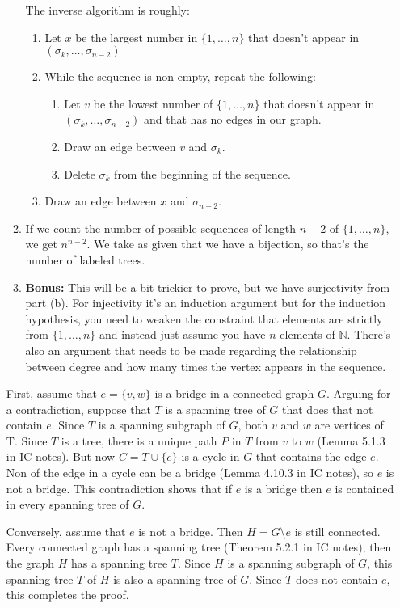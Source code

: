 \begin{enumerate}
\begin{enumerate}
    The inverse algorithm is roughly:
    \begin{enumerate}
    \item Let $x$ be the largest number in $\{1, \dots, n\}$ that doesn't appear in $(\sigma_k, \dots, \sigma_{n-2})$
    \item While the sequence is non-empty, repeat the following:
        \begin{enumerate}
            \item Let $v$ be the lowest number of $\{1, \dots, n\}$ that doesn't appear in $(\sigma_k, \dots, \sigma_{n-2})$ and that has no edges in our graph.
            \item Draw an edge between $v$ and $\sigma_k$.
            \item Delete $\sigma_{k}$ from the beginning of the sequence. 
        \end{enumerate}
    \item Draw an edge between $x$ and $\sigma_{n-2}$.
    \end{enumerate}
    \item If we count the number of possible sequences of length $n-2$ of $\{1, \dots, n\}$, we get $n^{n-2}$. We take as given that we have a bijection, so that's the number of labeled trees.

    \item \textbf{Bonus:} This will be a bit trickier to prove, but we have surjectivity from part (b). For injectivity it's an induction argument but for the induction hypothesis, you need to weaken the constraint that elements are strictly from $\{1, \dots, n\}$ and instead just assume you have $n$ elements of $\mathbb{N}$. There's also an argument that needs to be made regarding the relationship between degree and how many times the vertex appears in the sequence. 
    \end{enumerate}

    \newpage
     First, assume that $e=\{v,w\}$ is a bridge in a connected graph $G$. Arguing for a contradiction, suppose that $T$ is a spanning tree of $G$ that does that not contain $e$. Since $T$ is a spanning subgraph of $G$, both $v$ and $w$ are vertices of T. Since $T$ is a tree, there is a unique path $P$ in $T$ from $v$ to $w$ (Lemma 5.1.3 in IC notes). But now $C=T\cup\{e\}$ is a cycle in $G$ that contains the edge $e$. Non of the edge in a cycle can be a bridge (Lemma 4.10.3 in IC notes), so $e$ is not a bridge. This contradiction shows that if $e$ is a bridge then $e$ is contained in every spanning tree of $G$.

    Conversely, assume that $e$ is not a bridge. Then $H = G \setminus e$ is still connected. Every connected graph has a spanning tree (Theorem 5.2.1 in IC notes), then the graph $H$ has a spanning tree $T$. Since $H$ is a spanning subgraph of $G$, this spanning tree $T$ of $H$ is also a spanning tree of $G$. Since $T$ does not contain $e$, this completes the proof.
    
\end{enumerate}